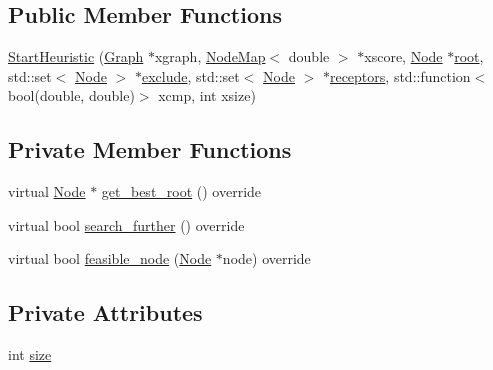 \subsection*{Public Member Functions}
\begin{DoxyCompactItemize}
\item 
\hyperlink{classderegnet_1_1StartHeuristic_aff83b16a2ae0fd4041f19f787a0da23f}{Start\+Heuristic} (\hyperlink{namespacederegnet_a55b76c55bbabc682cbc61f8b9948799e}{Graph} $\ast$xgraph, \hyperlink{namespacederegnet_ae102b707ae1d6f83c639ece5e0dd5658}{Node\+Map}$<$ double $>$ $\ast$xscore, \hyperlink{namespacederegnet_a744bad34f2de9856d36715a445f027f3}{Node} $\ast$\hyperlink{classderegnet_1_1DeregnetStartHeuristic_a4605d41352e3adf1f9f9f32466a4e61e}{root}, std\+::set$<$ \hyperlink{namespacederegnet_a744bad34f2de9856d36715a445f027f3}{Node} $>$ $\ast$\hyperlink{classderegnet_1_1DeregnetStartHeuristic_aa22c6581cd404bf7ac325850b28dc951}{exclude}, std\+::set$<$ \hyperlink{namespacederegnet_a744bad34f2de9856d36715a445f027f3}{Node} $>$ $\ast$\hyperlink{classderegnet_1_1DeregnetStartHeuristic_ab80c046ff2b7c64086fceb84987b3e50}{receptors}, std\+::function$<$ bool(double, double)$>$ xcmp, int xsize)
\end{DoxyCompactItemize}
\subsection*{Private Member Functions}
\begin{DoxyCompactItemize}
\item 
virtual \hyperlink{namespacederegnet_a744bad34f2de9856d36715a445f027f3}{Node} $\ast$ \hyperlink{classderegnet_1_1StartHeuristic_a84ed02caf211e22b663e4e3c0d5b4f24}{get\+\_\+best\+\_\+root} () override
\item 
virtual bool \hyperlink{classderegnet_1_1StartHeuristic_acbc34cb7479d3e68d6ef0554b739fc52}{search\+\_\+further} () override
\item 
virtual bool \hyperlink{classderegnet_1_1StartHeuristic_a1d7931058aceb84790f861a39f0a8bfd}{feasible\+\_\+node} (\hyperlink{namespacederegnet_a744bad34f2de9856d36715a445f027f3}{Node} $\ast$node) override
\end{DoxyCompactItemize}
\subsection*{Private Attributes}
\begin{DoxyCompactItemize}
\item 
int \hyperlink{classderegnet_1_1StartHeuristic_acd3b3c6a5103491c252b774545ad470b}{size}
\end{DoxyCompactItemize}
